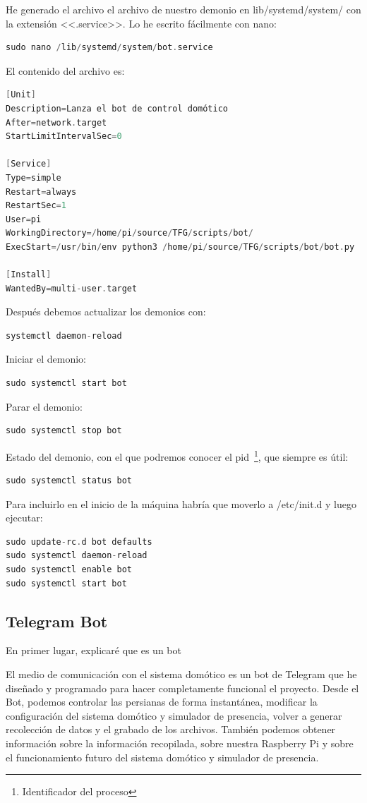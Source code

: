 He generado el archivo el archivo de nuestro demonio en lib/systemd/system/ con la extensión <<.service>>. Lo he escrito fácilmente con nano: 
\begin{lstlisting}[language=cpp, firstnumber=0]
sudo nano /lib/systemd/system/bot.service
\end{lstlisting}
El contenido del archivo es:
\begin{lstlisting}[language=cpp, caption={Modificaciones en el archivo /lib/systemd/system/bot.service.}, firstnumber=0]
[Unit]
Description=Lanza el bot de control domótico
After=network.target
StartLimitIntervalSec=0

[Service]
Type=simple
Restart=always
RestartSec=1
User=pi
WorkingDirectory=/home/pi/source/TFG/scripts/bot/
ExecStart=/usr/bin/env python3 /home/pi/source/TFG/scripts/bot/bot.py

[Install]
WantedBy=multi-user.target
\end{lstlisting}
Después debemos actualizar los demonios con: 
\begin{lstlisting}[language=cpp, firstnumber=0]
systemctl daemon-reload
\end{lstlisting}
Iniciar el demonio: 
\begin{lstlisting}[language=cpp, firstnumber=0]
sudo systemctl start bot
\end{lstlisting}
Parar el demonio: 
\begin{lstlisting}[language=cpp, firstnumber=0]
sudo systemctl stop bot
\end{lstlisting}
Estado del demonio, con el que podremos conocer el pid~\footnote{Identificador del proceso}, que siempre es útil: 
\begin{lstlisting}[language=cpp, firstnumber=0]
sudo systemctl status bot
\end{lstlisting}

Para incluirlo en el inicio de la máquina habría que moverlo a /etc/init.d y luego ejecutar: 
\begin{lstlisting}[language=cpp, firstnumber=0]    
sudo update-rc.d bot defaults
sudo systemctl daemon-reload
sudo systemctl enable bot
sudo systemctl start bot
\end{lstlisting}  


\subsection{Telegram Bot}\label{5.TelegramBot}
En primer lugar, explicaré que es un bot

El medio de comunicación con el sistema domótico es un bot de Telegram que he diseñado y programado para hacer completamente funcional el proyecto. Desde el Bot, podemos controlar las persianas de forma instantánea, modificar la configuración del sistema domótico y simulador de presencia, volver a generar recolección de datos y el grabado de los archivos. También podemos obtener información sobre la información recopilada, sobre nuestra Raspberry Pi y sobre el funcionamiento futuro del sistema domótico y simulador de presencia.

